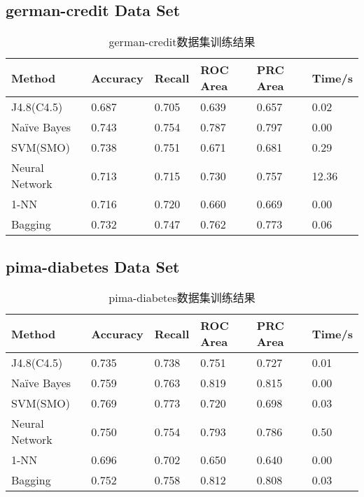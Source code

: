 \documentclass[a4paper,UTF8]{article}
\numberwithin{equation}{section}
\begin{document}
\subsection{german-credit Data Set}
\begin{table}[H]
\centering
\caption{german-credit数据集训练结果}
\label{my-label}
\begin{tabular}{l|lllll}
\hline
Method         & Accuracy & Recall & ROC Area & PRC Area & Time/s \\ \hline
J4.8(C4.5)     & 0.687    & 0.705  & 0.639    & 0.657    & 0.02   \\ \hline
Naïve Bayes   & 0.743    & 0.754  & 0.787    & 0.797    & 0.00   \\ \hline
SVM(SMO)       & 0.738    & 0.751  & 0.671    & 0.681    & 0.29   \\ \hline
Neural Network & 0.713    & 0.715  & 0.730    & 0.757    & 12.36  \\ \hline
1-NN           & 0.716    & 0.720  & 0.660    & 0.669    & 0.00   \\ \hline
Bagging        & 0.732    & 0.747  & 0.762    & 0.773    & 0.06   \\ \hline
\end{tabular}
\end{table}

\subsection{pima-diabetes Data Set}
\begin{table}[H]
\centering
\caption{pima-diabetes数据集训练结果}
\label{my-label}
\begin{tabular}{l|lllll}
\hline
Method         & Accuracy & Recall & ROC Area & PRC Area & Time/s \\ \hline
J4.8(C4.5)     & 0.735    & 0.738  & 0.751    & 0.727    & 0.01   \\ \hline
Naïve Bayes   & 0.759    & 0.763  & 0.819    & 0.815    & 0.00   \\ \hline
SVM(SMO)       & 0.769    & 0.773  & 0.720    & 0.698    & 0.03   \\ \hline
Neural Network & 0.750    & 0.754  & 0.793    & 0.786    & 0.50   \\ \hline
1-NN           & 0.696    & 0.702  & 0.650    & 0.640    & 0.00   \\ \hline
Bagging        & 0.752    & 0.758  & 0.812    & 0.808    & 0.03   \\ \hline
\end{tabular}
\end{table}
\end{document}

